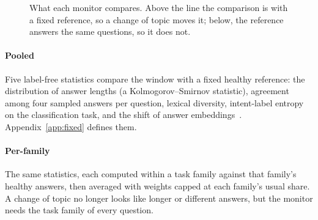 \documentclass{article}
\begin{document}
\begin{figure}[t]
  \centering
  \caption{What each monitor compares. Above the line the comparison is with a
  fixed reference, so a change of topic moves it; below, the reference answers the
  same questions, so it does not.}
  \label{fig:what}
\end{figure}

\paragraph{Pooled} Five label-free statistics compare the window with a fixed
healthy reference: the distribution of answer lengths (a Kolmogorov--Smirnov
statistic), agreement among four sampled answers per question, lexical diversity,
intent-label entropy on the classification task, and the shift of answer
embeddings~\citep{nussbaum2024nomic}. Appendix~\ref{app:fixed} defines them.

\paragraph{Per-family} The same statistics, each computed within a task family
against that family's healthy answers, then averaged with weights capped at each
family's usual share. A change of topic no longer looks like longer or different
answers, but the monitor needs the task family of every question.
\end{document}
